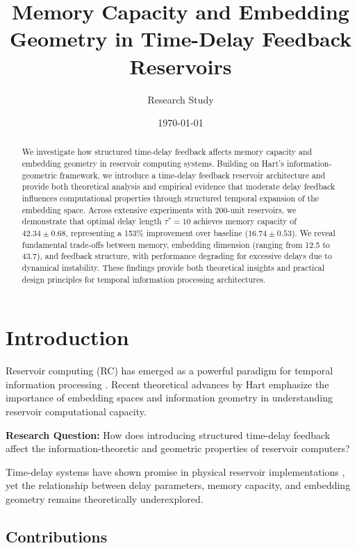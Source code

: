\documentclass[11pt]{article}
\title{Memory Capacity and Embedding Geometry in Time-Delay Feedback Reservoirs}
\author{Research Study}
\date{\today}
\begin{document}
\maketitle

\begin{abstract}
We investigate how structured time-delay feedback affects memory capacity and embedding geometry in reservoir computing systems. Building on Hart's information-geometric framework, we introduce a time-delay feedback reservoir architecture and provide both theoretical analysis and empirical evidence that moderate delay feedback influences computational properties through structured temporal expansion of the embedding space. Across extensive experiments with 200-unit reservoirs, we demonstrate that optimal delay length $\tau^*=10$ achieves memory capacity of $42.34 \pm 0.68$, representing a 153\% improvement over baseline ($16.74 \pm 0.53$). We reveal fundamental trade-offs between memory, embedding dimension (ranging from 12.5 to 43.7), and feedback structure, with performance degrading for excessive delays due to dynamical instability. These findings provide both theoretical insights and practical design principles for temporal information processing architectures.
\end{abstract}

\section{Introduction}

Reservoir computing (RC) has emerged as a powerful paradigm for temporal information processing \cite{jaeger2001,maass2002}. Recent theoretical advances by Hart \cite{hart2021thesis,hart2024symmetry,hart2021information} emphasize the importance of embedding spaces and information geometry in understanding reservoir computational capacity.

\textbf{Research Question:} How does introducing structured time-delay feedback affect the information-theoretic and geometric properties of reservoir computers?

Time-delay systems have shown promise in physical reservoir implementations \cite{appeltant2011,larger2012}, yet the relationship between delay parameters, memory capacity, and embedding geometry remains theoretically underexplored.

\subsection{Contributions}
\end{document}
